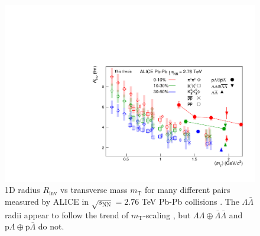 \begin{figure}[hbtp]
\includegraphics[width=36pc]{Figures/FitResults/2016-09-29-mTscaling.pdf}
\caption[$R_{\mathrm{inv}}$ vs $m_{\mathrm{T}}$]{1D radius $R_\mathrm{inv}$ vs transverse mass $m_\mathrm{T}$ for many different pairs measured by ALICE in $\sqrt{s_\mathrm{NN}} = 2.76$ TeV Pb-Pb collisions \cite{Adam:2015vja}.
The $\Lambda\bar{\Lambda}$ radii appear to follow the trend of $m_\mathrm{T}$-scaling \cite{Csorgo:1995bi,Lisa:2005dd}, but $\Lambda\Lambda\oplus\bar{\Lambda}\bar{\Lambda}$ and $\mathrm{p}\Lambda\oplus\bar{\mathrm{p}}\bar{\Lambda}$ do not.
}
\label{fig:RvsMt}
\end{figure}



